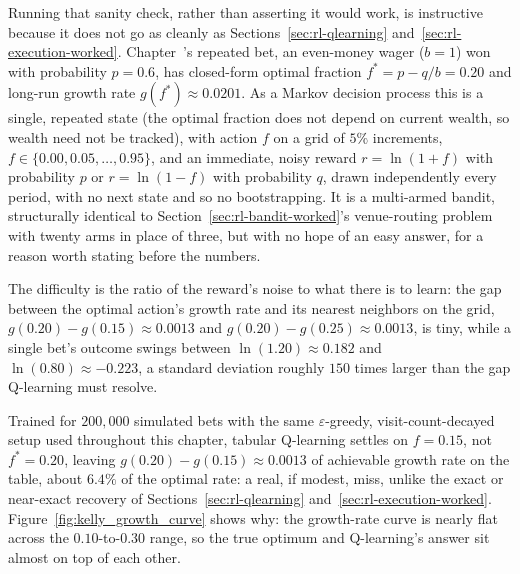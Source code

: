 \documentclass[../ai_in_finance]{subfiles}
\begin{document}
Running that sanity check, rather than asserting it would work, is instructive because it does not go as cleanly as Sections~\ref{sec:rl-qlearning} and~\ref{sec:rl-execution-worked}. Chapter~'s repeated bet, an even-money wager ($b=1$) won with probability $p=0.6$, has closed-form optimal fraction $f^*=p-q/b=0.20$ and long-run growth rate $g(f^*)\approx0.0201$. As a Markov decision process this is a single, repeated state (the optimal fraction does not depend on current wealth, so wealth need not be tracked), with action $f$ on a grid of $5\%$ increments, $f\in\{0.00,0.05,\ldots,0.95\}$, and an immediate, noisy reward $r=\ln(1+f)$ with probability $p$ or $r=\ln(1-f)$ with probability $q$, drawn independently every period, with no next state and so no bootstrapping. It is a multi-armed bandit, structurally identical to Section~\ref{sec:rl-bandit-worked}'s venue-routing problem with twenty arms in place of three, but with no hope of an easy answer, for a reason worth stating before the numbers.

The difficulty is the ratio of the reward's noise to what there is to learn: the gap between the optimal action's growth rate and its nearest neighbors on the grid, $g(0.20)-g(0.15)\approx0.0013$ and $g(0.20)-g(0.25)\approx0.0013$, is tiny, while a single bet's outcome swings between $\ln(1.20)\approx0.182$ and $\ln(0.80)\approx-0.223$, a standard deviation roughly $150$ times larger than the gap Q-learning must resolve.

Trained for $200{,}000$ simulated bets with the same $\varepsilon$-greedy, visit-count-decayed setup used throughout this chapter, tabular Q-learning settles on $f=0.15$, not $f^*=0.20$, leaving $g(0.20)-g(0.15)\approx0.0013$ of achievable growth rate on the table, about $6.4\%$ of the optimal rate: a real, if modest, miss, unlike the exact or near-exact recovery of Sections~\ref{sec:rl-qlearning} and~\ref{sec:rl-execution-worked}. Figure~\ref{fig:kelly_growth_curve} shows why: the growth-rate curve is nearly flat across the $0.10$-to-$0.30$ range, so the true optimum and Q-learning's answer sit almost on top of each other.
\end{document}
